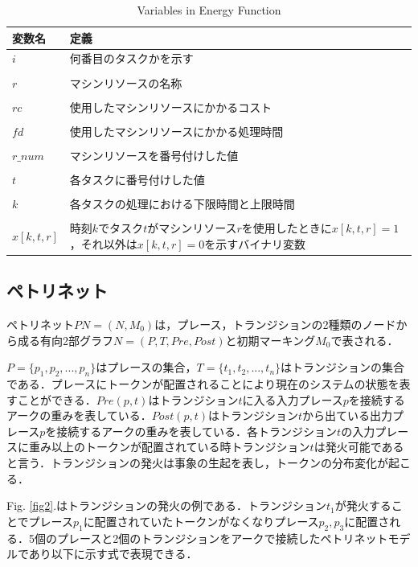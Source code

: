 \documentclass[conference]{IEEEtran}
\begin{document}
\begin{table}[h]
\centering
\caption{Variables in Energy Function}
\begin{tabularx}{0.45\textwidth}{>{\centering\arraybackslash}p{1.7cm}|X}
\hline
変数名 & 定義 \\ \hline 
$i$ & 何番目のタスクかを示す  \\ 
 & \\
$r$ & マシンリソースの名称 \\ 
 & \\
$rc$ & 使用したマシンリソースにかかるコスト  \\ 
 & \\
$fd$ & 使用したマシンリソースにかかる処理時間  \\ 
 & \\
$r\_num$ & マシンリソースを番号付けした値 \\ 
 & \\
$t$ & 各タスクに番号付けした値  \\ 
 & \\
$k$ & 各タスクの処理における下限時間と上限時間  \\ 
 & \\
$x[k,t,r]$ & 時刻$k$でタスク$t$がマシンリソース$r$を使用したときに$x[k,t,r]=1$，それ以外は$x[k,t,r]=0$を示すバイナリ変数 \\ \hline

\end{tabularx}
\label{variable}
\end{table}

\subsection{ペトリネット}
ペトリネット$PN = (N,M_0)$は，プレース，トランジションの2種類のノードから成る有向2部グラフ$N = (P,T,Pre,Post)$と初期マーキング$M_0$で表される．\cite{b2}

$P = \{p_1,p_2,...,p_n\}$はプレースの集合，$T = \{t_1,t_2,...,t_n\}$はトランジションの集合である．プレースにトークンが配置されることにより現在のシステムの状態を表すことができる．$Pre(p,t)$はトランジション$t$に入る入力プレース$p$を接続するアークの重みを表している．$Post(p,t)$はトランジション$t$から出ている出力プレース$p$を接続するアークの重みを表している．各トランジション$t$の入力プレースに重み以上のトークンが配置されている時トランジション$t$は発火可能であると言う．トランジションの発火は事象の生起を表し，トークンの分布変化が起こる．

Fig. \ref{fig2}.はトランジションの発火の例である．トランジション$t_1$が発火することでプレース$p_1$に配置されていたトークンがなくなりプレース$p_2,p_3$に配置される．5個のプレースと2個のトランジションをアークで接続したペトリネットモデルであり以下に示す式で表現できる．
\end{document}
